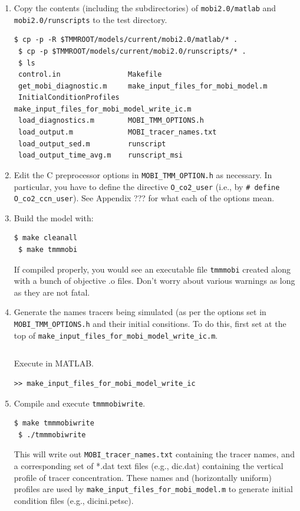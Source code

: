 \documentclass[a4paper]{article}
\def\noin{\noindent }
\begin{document}
\begin{enumerate}
\item Copy the contents (including the subdirectories) of \verb|mobi2.0/matlab| and  \verb|mobi2.0/runscripts| to the test directory.
\begin{lstlisting}[style=DOS]
 $ cp -p -R $TMMROOT/models/current/mobi2.0/matlab/* .
 $ cp -p $TMMROOT/models/current/mobi2.0/runscripts/* .
 $ ls
 control.in                Makefile
 get_mobi_diagnostic.m     make_input_files_for_mobi_model.m
 InitialConditionProfiles  make_input_files_for_mobi_model_write_ic.m
 load_diagnostics.m        MOBI_TMM_OPTIONS.h
 load_output.m             MOBI_tracer_names.txt
 load_output_sed.m         runscript
 load_output_time_avg.m    runscript_msi
\end{lstlisting}

\item Edit the C preprocessor options in \verb|MOBI_TMM_OPTION.h| as necessary. In particular, you have to define the directive \verb|O_co2_user| (i.e., by \verb|# define O_co2_ccn_user|). See Appendix ??? for what each of the options mean. 

\item Build the model with:
\begin{lstlisting}[style=DOS]
 $ make cleanall
 $ make tmmmobi
\end{lstlisting}
\noin If compiled properly, you would see an executable file \verb|tmmmobi| created along with a bunch of objective .o files. Don't worry about various warnings as long as they are not fatal. 

\item Generate the names tracers being simulated (as per the options set in \verb|MOBI_TMM_OPTIONS.h| and their initial consitions. To do this, first set at the top of \verb|make_input_files_for_mobi_model_write_ic.m|. 
\lstset{language=matlab} 
\begin{lstlisting}[frame=single,basicstyle=\scriptsize,commentstyle=\color{blue}]
 % make_input_files_for_mobi_model_write_ic.m
\end{lstlisting}
\noin Execute in MATLAB.
\begin{lstlisting}[style=DOS]
 >> make_input_files_for_mobi_model_write_ic
\end{lstlisting}

\item Compile and execute \verb|tmmmobiwrite|. 
\begin{lstlisting}[style=DOS]
 $ make tmmmobiwrite
 $ ./tmmmobiwrite
\end{lstlisting}
\noin This will write out \verb|MOBI_tracer_names.txt| containing the tracer names, and a corresponding set of *.dat text files (e.g., dic.dat) containing the vertical profile of tracer concentration. These names and (horizontally uniform) profiles are used by \verb|make_input_files_for_mobi_model.m| to generate initial condition files (e.g., dicini.petsc). 


\end{enumerate}
\end{document}
